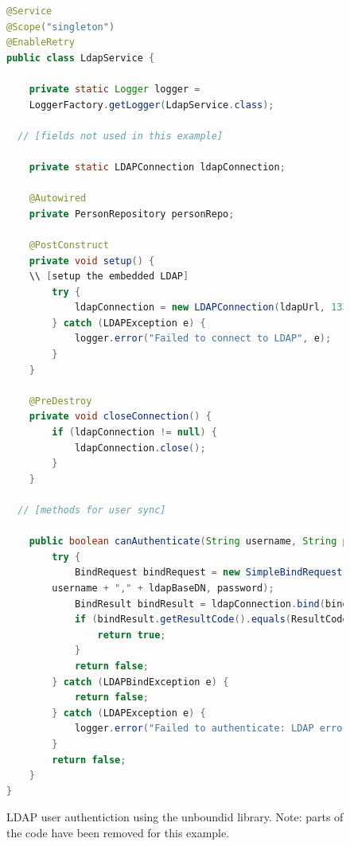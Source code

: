 \begin{figure}
\begin{lstlisting}[language=Java]
@Service
@Scope("singleton")
@EnableRetry
public class LdapService {

	private static Logger logger =
    LoggerFactory.getLogger(LdapService.class);

  // [fields not used in this example]

	private static LDAPConnection ldapConnection;

	@Autowired
	private PersonRepository personRepo;

	@PostConstruct
	private void setup() {
    \\ [setup the embedded LDAP]
		try {
			ldapConnection = new LDAPConnection(ldapUrl, 1338);
		} catch (LDAPException e) {
			logger.error("Failed to connect to LDAP", e);
		}
	}

	@PreDestroy
	private void closeConnection() {
		if (ldapConnection != null) {
			ldapConnection.close();
		}
	}

  // [methods for user sync]

	public boolean canAuthenticate(String username, String password) {
		try {
			BindRequest bindRequest = new SimpleBindRequest("uid=" +
        username + "," + ldapBaseDN, password);
			BindResult bindResult = ldapConnection.bind(bindRequest);
			if (bindResult.getResultCode().equals(ResultCode.SUCCESS)) {
				return true;
			}
			return false;
		} catch (LDAPBindException e) {
			return false;
		} catch (LDAPException e) {
			logger.error("Failed to authenticate: LDAP error", e);
		}
		return false;
	}
}
\end{lstlisting}
\caption[LDAP User Authentication (Code)]{LDAP user authentiction using the unboundid library. Note: parts of the code have been removed for this example.}
\end{figure}


